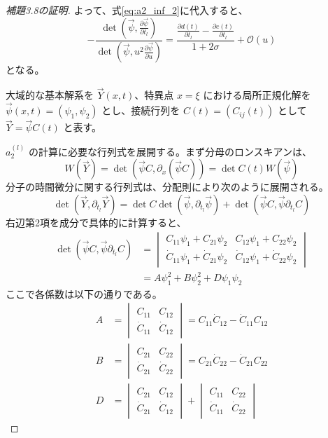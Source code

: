 \begin{story}
\begin{proof}[補題3.8の証明]
よって、式\eqref{eq:a2_inf_2}に代入すると、
\begin{equation}
     - \frac{\det\left(\vec{\psi}, \frac{\partial \vec{\psi}}{\partial t_l}\right)}{\det\left(\vec{\psi}, u^2 \frac{\partial \vec{\psi}}{\partial u}\right)}= \frac{\frac{\partial d(t)}{\partial t_l} - \frac{\partial c(t)}{\partial t_l}}{1+2\sigma} + \mathcal{O}(u)
\end{equation}
となる。

大域的な基本解系を $\vec{Y}(x,t)$、特異点 $x=\xi$ における局所正規化解を $\vec{\psi}(x,t) = (\psi_1, \psi_2)$ とし、接続行列を $C(t) = (C_{ij}(t))$ として $\vec{Y} = \vec{\psi}C(t)$ と表す。

$a_2^{(l)}$ の計算に必要な行列式を展開する。まず分母のロンスキアンは、
\begin{equation}
    W(\vec{Y}) = \det(\vec{\psi}C, \partial_x(\vec{\psi}C)) = \det C(t) W(\vec{\psi})
\end{equation}
分子の時間微分に関する行列式は、分配則により次のように展開される。
\begin{equation}
    \det(\vec{Y}, \partial_{t_l}\vec{Y}) = \det C \det(\vec{\psi}, \partial_{t_l}\vec{\psi}) + \det(\vec{\psi}C, \vec{\psi}\partial_{t_l}C)
\end{equation}
右辺第2項を成分で具体的に計算すると、
\begin{align*}
    \det(\vec{\psi}C, \vec{\psi}\partial_{t_l}C) 
    &= \begin{vmatrix} 
        C_{11}\psi_1 + C_{21}\psi_2 & C_{12}\psi_1 + C_{22}\psi_2 \\ 
        \dot{C}_{11}\psi_1 + \dot{C}_{21}\psi_2 & \dot{C}_{12}\psi_1 + \dot{C}_{22}\psi_2 
    \end{vmatrix} \\
    &= A\psi_1^2 + B\psi_2^2 + D\psi_1\psi_2
\end{align*}
ここで各係数は以下の通りである。
\begin{align*}
    A &= \begin{vmatrix} C_{11} & C_{12} \\ \dot{C}_{11} & \dot{C}_{12} \end{vmatrix} = C_{11}\dot{C}_{12} - \dot{C}_{11}C_{12} \\
    B &= \begin{vmatrix} C_{21} & C_{22} \\ \dot{C}_{21} & \dot{C}_{22} \end{vmatrix} = C_{21}\dot{C}_{22} - \dot{C}_{21}C_{22} \\
    D &= \begin{vmatrix} C_{21} & C_{12} \\ \dot{C}_{21} & \dot{C}_{12} \end{vmatrix} + \begin{vmatrix} C_{11} & C_{22} \\ \dot{C}_{11} & \dot{C}_{22} \end{vmatrix}
\end{align*}


\end{proof}
\end{story}
